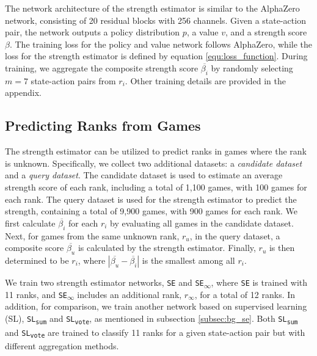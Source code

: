 The network architecture of the strength estimator is similar to the AlphaZero network, consisting of 20 residual blocks with 256 channels.
Given a state-action pair, the network outputs a policy distribution $p$, a value $v$, and a strength score $\beta$.
The training loss for the policy and value network follows AlphaZero, while the loss for the strength estimator is defined by equation \ref{equ:loss_function}.
During training, we aggregate the composite strength score $\overline{\beta_i}$ by randomly selecting $m=7$ state-action pairs from $r_i$.
Other training details are provided in the appendix.

\subsection{Predicting Ranks from Games}
\label{subsec:exp_acc}
The strength estimator can be utilized to predict ranks in games where the rank is unknown.
Specifically, we collect two additional datasets: a \textit{candidate dataset} and a \textit{query dataset}.
The candidate dataset is used to estimate an average strength score of each rank, including a total of 1,100 games, with 100 games for each rank.
The query dataset is used for the strength estimator to predict the strength, containing a total of 9,900 games, with 900 games for each rank.
We first calculate $\overline{\beta_i}$ for each $r_i$ by evaluating all games in the candidate dataset.
Next, for games from the same unknown rank, $r_u$, in the query dataset, a composite score $\overline{\beta_u}$ is calculated by the strength estimator.
Finally, $r_u$ is then determined to be $r_i$, where $|\overline{\beta_u}-\overline{\beta_i}|$ is the smallest among all $r_i$.



We train two strength estimator networks, \texttt{SE} and \texttt{SE\textsubscript{$\infty$}}, where \texttt{SE} is trained with 11 ranks, and \texttt{SE\textsubscript{$\infty$}} includes an additional rank, $r_{\infty}$, for a total of 12 ranks.
In addition, for comparison, we train another network based on supervised learning (SL), \texttt{SL\textsubscript{sum}} and \texttt{SL\textsubscript{vote}}, as mentioned in subsection \ref{subsec:bg_se}.
Both \texttt{SL\textsubscript{sum}} and \texttt{SL\textsubscript{vote}} are trained to classify 11 ranks for a given state-action pair but with different aggregation methods.

